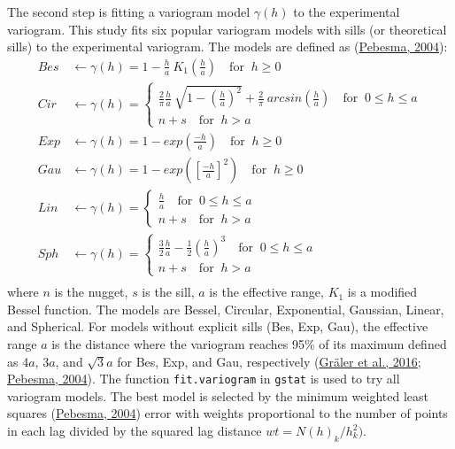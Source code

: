 The second step is fitting a variogram model \(\gamma(h)\) to the experimental variogram. This study fits six popular variogram models with sills (or theoretical sills) to the experimental variogram. The models are defined as (\protect\hyperlink{ref-pebesma2004}{Pebesma, 2004}):
\begin{equation}
  \begin{aligned}
    Bes &\leftarrow \gamma(h) = 1 - \frac{h}{a}\ K_1\left(\frac{h}{a}\right) \quad \text{for } \  h \geq 0 \\
    Cir &\leftarrow \gamma(h) =
    \begin{cases}
      \frac{2}{\pi}\frac{h}{a}\ \sqrt{1-\left(\frac{h}{a}\right)^2} + \frac{2}{\pi}\ arcsin\left(\frac{h}{a}\right) \quad \text{for } \  0 \leq h \leq a \\
      n + s \quad \text{for } \  h > a
    \end{cases} \\
    Exp &\leftarrow \gamma(h) = 1 - exp\left(\frac{-h}{a}\right) \quad \text{for } \  h \geq 0 \\
    Gau &\leftarrow \gamma(h) = 1 - exp\left(\left[\frac{-h}{a}\right]^2\right) \quad \text{for } \  h \geq 0 \\
    Lin &\leftarrow \gamma(h) =
    \begin{cases}
      \frac{h}{a} \quad \text{for } \  0 \leq h \leq a \\
      n + s \quad \text{for } \  h > a
    \end{cases} \\
    Sph &\leftarrow \gamma(h) =
    \begin{cases}
      \frac{3}{2}\frac{h}{a} - \frac{1}{2}\left(\frac{h}{a}\right)^3 \quad \text{for } \  0 \leq h \leq a \\
      n + s \quad \text{for } \  h > a
    \end{cases} \\
  \end{aligned}
  \label{eq:varMods}
\end{equation}
where \(n\) is the nugget, \(s\) is the sill, \(a\) is the effective range, \(K_1\) is a modified Bessel function. The models are Bessel, Circular, Exponential, Gaussian, Linear, and Spherical. For models without explicit sills (Bes, Exp, Gau), the effective range \(a\) is the distance where the variogram reaches 95\% of its maximum defined as 4\(a\), 3\(a\), and \(\sqrt{3}a\) for Bes, Exp, and Gau, respectively (\protect\hyperlink{ref-graler2016}{Gräler et al., 2016}; \protect\hyperlink{ref-pebesma2004}{Pebesma, 2004}). The function \texttt{fit.variogram} in \texttt{gstat} is used to try all variogram models. The best model is selected by the minimum weighted least squares (\protect\hyperlink{ref-pebesma2004}{Pebesma, 2004}) error with weights proportional to the number of points in each lag divided by the squared lag distance \(wt = N(h)_k/h_k^2)\).

